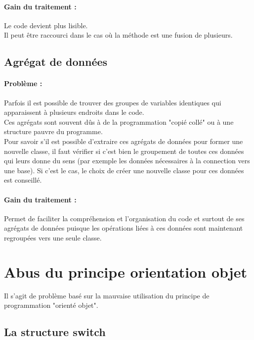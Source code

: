 \documentclass[a4paper,twoside,12pt,openright]{report}
\begin{document}
\paragraph{Gain du traitement :}
Le code devient plus lisible.\\
Il peut être raccourci dans le cas où la méthode est une fusion de plusieurs.\\

\subsection{Agrégat de données}
\paragraph{Problème :}
Parfois il est possible de trouver des groupes de variables identiques qui apparaissent à plusieurs endroits dans le code.\\
Ces agrégats sont souvent dûs à de la programmation "copié collé" ou à une structure pauvre du programme.\\
Pour savoir s'il est possible d'extraire ces agrégats de données pour former une nouvelle classe, il faut vérifier si c'est bien le groupement de toutes ces données qui leurs donne du sens (par exemple les données nécessaires à la connection vers une base). Si c'est le cas, le choix de créer une nouvelle classe pour ces données est conseillé.\\

\paragraph{Gain du traitement :}
Permet de faciliter la compréhension et l'organisation du code et surtout de ses agrégats de données puisque les opérations liées à ces données sont maintenant regroupées vers une seule classe.\\

\section{Abus du principe orientation objet}
Il s'agit de problème basé sur la mauvaise utilisation du principe de programmation "orienté objet".\\

\subsection{La structure switch}
\end{document}

